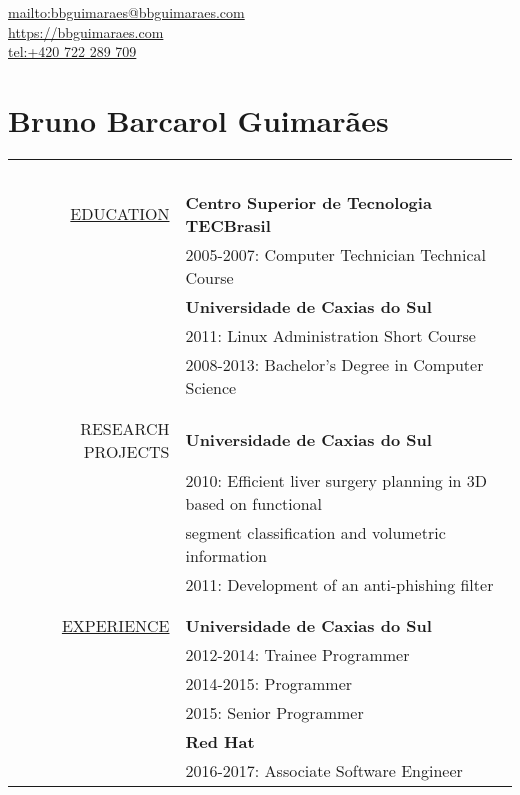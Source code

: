 \begin{flushright}
    \url{mailto:bbguimaraes@bbguimaraes.com} \\
    \url{https://bbguimaraes.com} \\
    \url{tel:+420 722 289 709}
\end{flushright}

\section*{Bruno Barcarol Guimarães}
\bigskip

\begin{center}

\begin{tabular}{rl}
    \multicolumn{2}{c}{~\hspace{.95\textwidth}~} \\
    \hspace{5em}
    \hyperref[sec:education]{\uppercase{Education}}
    & \textbf{Centro Superior de Tecnologia TECBrasil} \\
    & 2005-2007: Computer Technician Technical Course \\
    & \textbf{Universidade de Caxias do Sul} \\
    & 2011: Linux Administration Short Course \\
    & 2008-2013: Bachelor's Degree in Computer Science
    \\\\ \hline \\
    \uppercase{Research projects}
    & \textbf{Universidade de Caxias do Sul} \\
    & 2010: Efficient liver surgery planning in 3D based on functional \\
    & \hphantom{2010: }segment classification and volumetric information \\
    & 2011: Development of an anti-phishing filter
    \\\\ \hline \\
    \hyperref[sec:professional]{\uppercase{Experience}}
    & \textbf{Universidade de Caxias do Sul} \\
    & 2012-2014: Trainee Programmer \\
    & 2014-2015: Programmer \\
    & 2015: Senior Programmer \\
    & \textbf{Red Hat} \\
    & 2016-2017: Associate Software Engineer \\

\end{tabular}
\end{center}
